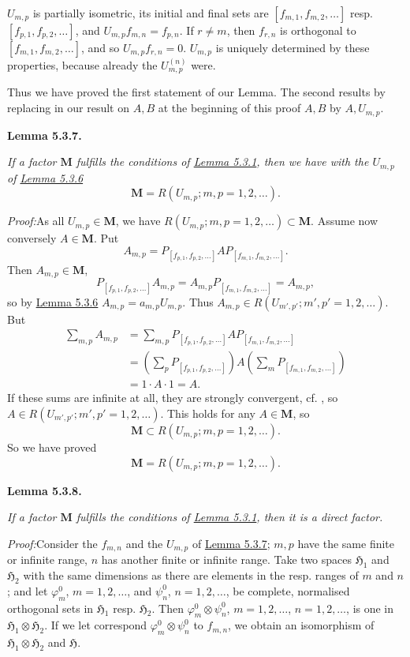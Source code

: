 \documentclass[12pt,b5paper,twoside]{article}
\newcommand{\Hspace}{\mathfrak H}
\newcommand{\M}{\mathbf M}
\newcommand{\Lemma}[1]{%
  \par\smallskip\noindent\phantomsection\label{lem:#1}\textbf{Lemma #1.}\enspace
}
\newcommand{\Proof}{\par\noindent\textit{Proof:}\enspace}
\newcommand{\lemref}[1]{\hyperref[lem:#1]{Lemma #1}}
\begin{document}
$U_{m,p}$ is partially isometric, its initial and final sets are
$[f_{m,1},f_{m,2},\ldots]$ resp. $[f_{p,1},f_{p,2},\ldots]$, and
$U_{m,p}f_{m,n}=f_{p,n}$. If $r\neq m$, then $f_{r,n}$ is orthogonal to
$[f_{m,1},f_{m,2},\ldots]$, and so $U_{m,p}f_{r,n}=0$. $U_{m,p}$ is uniquely
determined by these properties, because already the $U_{m,p}^{(n)}$ were.

Thus we have proved the first statement of our Lemma. The second results by
replacing in our result on $A,B$ at the beginning of this proof $A,B$ by
$A,U_{m,p}$.

\Lemma{5.3.7}
\emph{If a factor $\M$ fulfills the conditions of \lemref{5.3.1}, then we
have with the $U_{m,p}$ of \lemref{5.3.6}}
\[
 \M=R(U_{m,p};m,p=1,2,\ldots).
\]

\Proof As all $U_{m,p}\in\M$, we have
$R(U_{m,p};m,p=1,2,\ldots)\subset\M$. Assume now conversely $A\in\M$.
Put
\[
 A_{m,p}=P_{[f_{p,1},f_{p,2},\ldots]}
 A P_{[f_{m,1},f_{m,2},\ldots]}.
\]
Then $A_{m,p}\in\M$,
\[
 P_{[f_{p,1},f_{p,2},\ldots]}A_{m,p}
 =A_{m,p}P_{[f_{m,1},f_{m,2},\ldots]}=A_{m,p},
\]
so by \lemref{5.3.6} $A_{m,p}=a_{m,p}U_{m,p}$. Thus
$A_{m,p}\in R(U_{m',p'};m',p'=1,2,\ldots)$. But
\begin{align*}
 \sum_{m,p}A_{m,p}
 &=\sum_{m,p}P_{[f_{p,1},f_{p,2},\ldots]}
 A P_{[f_{m,1},f_{m,2},\ldots]}\\
 &=\left(\sum_pP_{[f_{p,1},f_{p,2},\ldots]}\right)
 A\left(\sum_mP_{[f_{m,1},f_{m,2},\ldots]}\right)\\
 &=1\cdot A\cdot1=A.
\end{align*}
If these sums are infinite at all, they are strongly convergent,
cf. \cite[pp.~77--78]{ref16}, so
$A\in R(U_{m',p'};m',p'=1,2,\ldots)$. This holds for any $A\in\M$, so
\[
 \M\subset R(U_{m,p};m,p=1,2,\ldots).
\]
So we have proved
\[
 \M=R(U_{m,p};m,p=1,2,\ldots).
\]

\Lemma{5.3.8}
\emph{If a factor $\M$ fulfills the conditions of \lemref{5.3.1}, then it is
a direct factor.}

\Proof Consider the $f_{m,n}$ and the $U_{m,p}$ of \lemref{5.3.7}; $m,p$
have the same finite or infinite range, $n$ has another finite or infinite
range. Take two spaces $\Hspace_1$ and $\Hspace_2$ with the same dimensions as
there are elements in the resp. ranges of $m$ and $n$; and let
$\varphi_m^0$, $m=1,2,\ldots$, and $\psi_n^0$, $n=1,2,\ldots$, be complete,
normalised orthogonal sets in $\Hspace_1$ resp. $\Hspace_2$. Then
$\varphi_m^0\otimes\psi_n^0$, $m=1,2,\ldots$, $n=1,2,\ldots$, is one in
$\Hspace_1\otimes\Hspace_2$. If we let correspond
$\varphi_m^0\otimes\psi_n^0$ to $f_{m,n}$, we obtain an isomorphism of
$\Hspace_1\otimes\Hspace_2$ and $\Hspace$.
\end{document}
